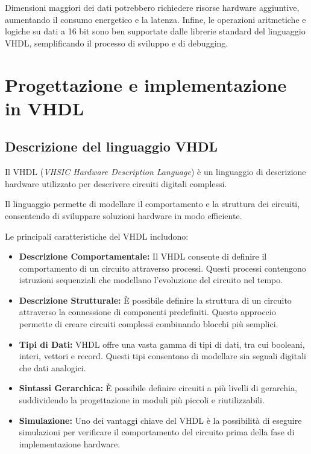 \documentclass[titlepage]{report}
\begin{document}
			Dimensioni maggiori dei dati potrebbero richiedere risorse hardware aggiuntive, aumentando il consumo energetico e la latenza.
			Infine, le operazioni aritmetiche e logiche su dati a 16 bit sono ben supportate dalle librerie standard del linguaggio VHDL, semplificando il processo di sviluppo e di debugging.


\chapter*{Progettazione e implementazione in VHDL}
\label{ch:progettazione_vhdl}

	\section{Descrizione del linguaggio VHDL}
	\label{sec:desc_vhdl}
		Il VHDL (\textit{VHSIC Hardware Description Language}) è un linguaggio di descrizione hardware utilizzato per descrivere circuiti digitali complessi.

		Il linguaggio permette di modellare il comportamento e la struttura dei circuiti, consentendo di sviluppare soluzioni hardware in modo efficiente.

		Le principali caratteristiche del VHDL includono:
		\begin{itemize}
			\item \textbf{Descrizione Comportamentale:} Il VHDL consente di definire il comportamento di un circuito attraverso processi. Questi processi contengono istruzioni sequenziali che modellano l'evoluzione del circuito nel tempo.
			
			\item \textbf{Descrizione Strutturale:} È possibile definire la struttura di un circuito attraverso la connessione di componenti predefiniti. Questo approccio permette di creare circuiti complessi combinando blocchi più semplici.
			
			\item \textbf{Tipi di Dati:} VHDL offre una vasta gamma di tipi di dati, tra cui booleani, interi, vettori e record. Questi tipi consentono di modellare sia segnali digitali che dati analogici.
			
			\item \textbf{Sintassi Gerarchica:} È possibile definire circuiti a più livelli di gerarchia, suddividendo la progettazione in moduli più piccoli e riutilizzabili.
			
			\item \textbf{Simulazione:} Uno dei vantaggi chiave del VHDL è la possibilità di eseguire simulazioni per verificare il comportamento del circuito prima della fase di implementazione hardware.
		\end{itemize}
\end{document}
